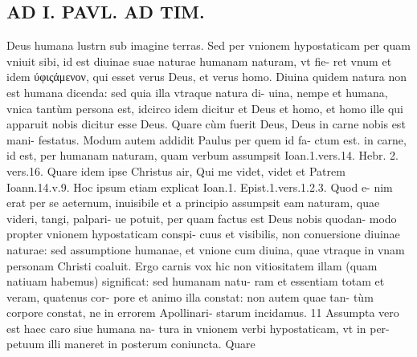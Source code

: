 \documentclass{article}
\begin{document}
\begin{pages}
\section*{AD I. PAVL. AD TIM. }
\marginpar{[ p.176 ]}\pstart Deus humana lustrn sub imagine terras. Sed per vnionem hypostaticam per quam vniuit sibi, id est diuinae suae naturae humanam naturam, vt fie- ret vnum et idem ύφιςάμενον, qui esset verus Deus, et verus homo. Diuina quidem natura non est humana dicenda: sed quia illa vtraque natura di- uina, nempe et humana, vnica tantùm persona est, idcirco idem dicitur et Deus et homo, et homo ille qui apparuit nobis dicitur esse Deus. Quare cùm fuerit Deus, Deus in carne nobis est mani- festatus.  \pend\pstart Modum autem addidit Paulus per quem id fa- ctum est. in carne, id est, per humanam naturam, quam verbum assumpsit Ioan.1.vers.14. Hebr. 2. vers.16. Quare idem ipse Christus air, Qui me videt, videt et Patrem Ioann.14.v.9. Hoc ipsum etiam explicat Ioan.1. Epist.1.vers.1.2.3. Quod e- nim erat per se aeternum, inuisibile et a principio assumpsit eam naturam, quae videri, tangi, palpari- ue potuit, per quam factus est Deus nobis quodan- modo propter vnionem hypostaticam conspi- cuus et visibilis, non conuersione diuinae naturae: sed assumptione humanae, et vnione cum diuina, quae vtraque in vnam personam Christi coaluit. Ergo carnis vox hic non vitiositatem illam (quam natiuam habemus) significat: sed humanam natu- ram et essentiam totam et veram, quatenus cor- pore et animo illa constat: non autem quae tan- tùm corpore constat, ne in errorem Apollinari- starum incidamus. 11  \pend\pstart Assumpta vero est haec caro siue humana na- tura in vnionem verbi hypostaticam, vt in per- petuum illi maneret in posterum coniuncta. Quare  \pend

\end{pages}
\end{document}
